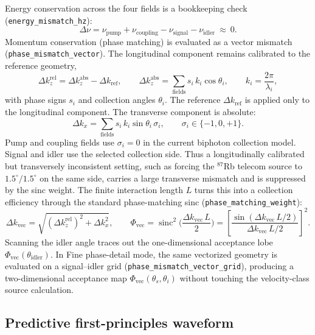 \documentclass[11pt]{article}
\newcommand{\sinc}{\operatorname{sinc}}
\newcommand{\code}[1]{\texttt{#1}}
\begin{document}
Energy conservation across the four fields is a bookkeeping check
(\code{energy\_mismatch\_hz}):
\begin{equation}
\Delta\nu = \nu_{\text{pump}}+\nu_{\text{coupling}}-\nu_{\text{signal}}-\nu_{\text{idler}}\ \approx\ 0.
\end{equation}
Momentum conservation (phase matching) is evaluated as a vector mismatch
(\code{phase\_mismatch\_vector}). The longitudinal component remains calibrated
to the reference geometry,
\begin{equation}
\Delta k_z^{\text{rel}}
=\Delta k_z^{\text{abs}}-\Delta k_{\text{ref}},
\qquad
\Delta k_z^{\text{abs}}
=\sum_{\text{fields}}s_i\,k_i\cos\theta_i,
\qquad k_i=\frac{2\pi}{\lambda_i},
\end{equation}
with phase signs $s_i$ and collection angles $\theta_i$. The reference
$\Delta k_{\text{ref}}$ is applied only to the longitudinal component. The
transverse component is absolute:
\begin{equation}
\Delta k_x=\sum_{\text{fields}}s_i\,k_i\sin\theta_i\,\sigma_i,
\qquad
\sigma_i\in\{-1,0,+1\}.
\end{equation}
Pump and coupling fields use $\sigma_i=0$ in the current biphoton collection
model. Signal and idler use the selected collection side. Thus a longitudinally
calibrated but transversely inconsistent setting, such as forcing the
$^{87}$Rb telecom source to $1.5^\circ/1.5^\circ$ on the same side, carries a
large transverse mismatch and is suppressed by the sinc weight.
The finite interaction length $L$ turns this into a collection efficiency through
the standard phase-matching sinc (\code{phase\_matching\_weight}):
\begin{equation}
\Delta k_{\text{vec}}=
\sqrt{\left(\Delta k_z^{\text{rel}}\right)^2+\Delta k_x^2},
\qquad
\Phi_{\text{vec}}=\sinc^2\!\Big(\frac{\Delta k_{\text{vec}}\,L}{2}\Big)
=\left[\frac{\sin(\Delta k_{\text{vec}}\,L/2)}
{\Delta k_{\text{vec}}\,L/2}\right]^2.
\label{eq:sinc}
\end{equation}
Scanning the idler angle traces out the one-dimensional acceptance lobe
$\Phi_{\text{vec}}(\theta_{\text{idler}})$. In Fine phase-detail mode, the same
vectorized geometry is evaluated on a signal--idler grid
(\code{phase\_mismatch\_vector\_grid}), producing a two-dimensional acceptance map
$\Phi_{\text{vec}}(\theta_s,\theta_i)$ without touching the velocity-class source
calculation.

\subsection{Predictive first-principles waveform}
\label{sec:predictive}
\end{document}
